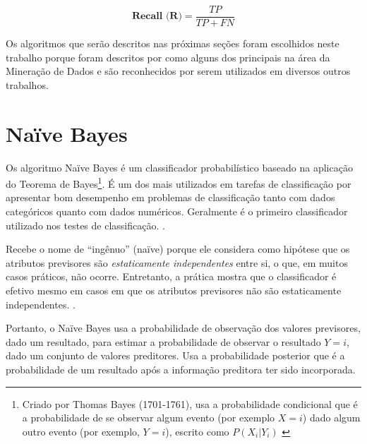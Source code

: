 \begin{equation}\label{eq:recall}
\textbf{Recall (R)} = \frac{TP}{TP + FN}
\end{equation}

Os algoritmos que serão descritos nas próximas seções foram escolhidos neste trabalho porque foram descritos por  como alguns dos principais na área da Mineração de Dados e são reconhecidos por serem utilizados em diversos outros trabalhos.

\section{Naïve Bayes}\label{sec:naive-bayes}
Os algoritmo Naïve Bayes é um classificador probabilístico baseado na aplicação do Teorema de Bayes\footnote{Criado por Thomas Bayes (1701-1761), usa a probabilidade condicional que é a probabilidade de se observar algum evento (por exemplo $X = i$) dado algum outro evento (por exemplo, $Y=i$), escrito como $P(X_i|Y_i)$ \cite{bruce_estatistica_2019}}. É um dos mais utilizados em tarefas de classificação por apresentar bom desempenho em problemas de classificação tanto com dados categóricos quanto com dados numéricos. Geralmente é o primeiro classificador utilizado nos testes de classificação. \cite{Boscarioli2017,amaral_introducao_2018,goldschmidt2005,bruce_estatistica_2019}.

Recebe o nome de ``ingênuo'' (naïve) porque ele considera como hipótese que os atributos previsores são \textit{estaticamente independentes} entre si, o que, em muitos casos práticos, não ocorre. Entretanto, a prática mostra que o classificador é efetivo mesmo em casos em que os atributos previsores não são estaticamente independentes. \cite{Boscarioli2017, goldschmidt2005, bruce_estatistica_2019}.

Portanto, o Naïve Bayes usa a probabilidade de observação dos valores previsores, dado um resultado, para estimar a probabilidade de observar o resultado $Y = i $, dado um conjunto de valores preditores. Usa a probabilidade posterior que é a probabilidade de um resultado após a informação preditora ter sido incorporada.

